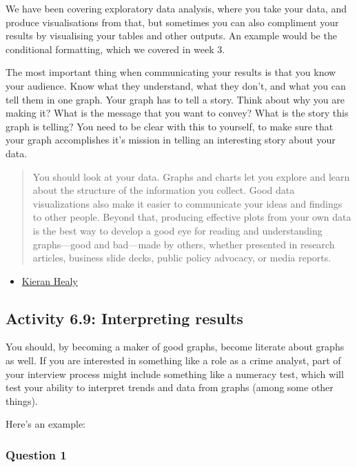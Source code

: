 \documentclass[
]{book}
\providecommand{\tightlist}{%
  \setlength{\itemsep}{0pt}\setlength{\parskip}{0pt}}
\begin{document}
We have been covering exploratory data analysis, where you take your data, and produce visualisations from that, but sometimes you can also compliment your results by visualising your tables and other outputs. An example would be the conditional formatting, which we covered in week 3.

The most important thing when communicating your results is that you know your audience. Know what they understand, what they don't, and what you can tell them in one graph. Your graph has to tell a story. Think about why you are making it? What is the message that you want to convey? What is the story this graph is telling? You need to be clear with this to yourself, to make sure that your graph accomplishes it's mission in telling an interesting story about your data.

\begin{quote}
You should look at your data. Graphs and charts let you explore and learn about the structure of the information you collect. Good data visualizations also make it easier to communicate your ideas and findings to other people. Beyond that, producing effective plots from your own data is the best way to develop a good eye for reading and understanding graphs---good and bad---made by others, whether presented in research articles, business slide decks, public policy advocacy, or media reports.
\end{quote}

\begin{itemize}
\tightlist
\item
  \href{http://socviz.co/}{Kieran Healy}
\end{itemize}

\hypertarget{activity-6.9-interpreting-results}{%
\subsection{Activity 6.9: Interpreting results}\label{activity-6.9-interpreting-results}}

You should, by becoming a maker of good graphs, become literate about graphs as well. If you are interested in something like a role as a crime analyst, part of your interview process might include something like a numeracy test, which will test your ability to interpret trends and data from graphs (among some other things).

Here's an example:

\hypertarget{question-1}{%
\subsubsection*{Question 1}\label{question-1}}
\end{document}

